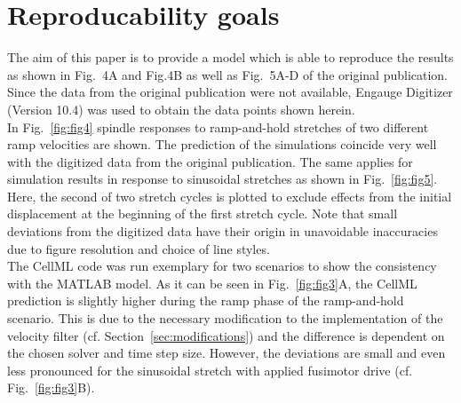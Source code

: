 \documentclass[fleqn,10pt]{physiome}
\begin{document}
\section{Reproducability goals}\label{sec:reprod}
The aim of this paper is to provide a model which is able to reproduce the results as shown in Fig.~4A and Fig.4B as well as Fig.~5A-D of the original publication. 
Since the data from the original publication were not available, Engauge Digitizer (Version 10.4) was used to obtain the data points shown herein.\\
In Fig.~\ref{fig:fig4} spindle responses to ramp-and-hold stretches of two different ramp velocities are shown.
The prediction of the simulations coincide very well with the digitized data from the original publication. 
The same applies for simulation results in response to sinusoidal stretches as shown in Fig.~\ref{fig:fig5}.
Here, the second of two stretch cycles is plotted to exclude effects from the initial displacement at the beginning of the first stretch cycle. 
Note that small deviations from the digitized data have their origin in unavoidable inaccuracies due to figure resolution and choice of line styles. \\
The CellML code was run exemplary for two scenarios to show the consistency with the MATLAB model. 
As it can be seen in Fig.~\ref{fig:fig3}A, the CellML prediction is slightly higher during the ramp phase of the ramp-and-hold scenario. 
This is due to the necessary modification to the implementation of the velocity filter (cf. Section~\ref{sec:modifications}) and the difference is  dependent on the chosen solver and time step size. 
However, the deviations are  small and even less pronounced for the sinusoidal stretch with applied fusimotor drive (cf. Fig.~\ref{fig:fig3}B).
\end{document}
